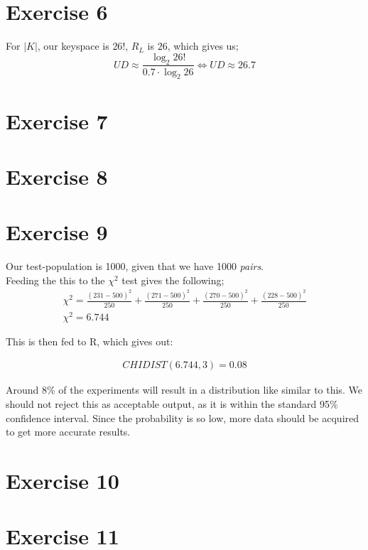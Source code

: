 \documentclass[10pt,a4paper]{article}
\begin{document}
\section*{Exercise 6}
For $|K|$, our keyspace is $26!$, $R_L$ is $26$, which gives us;
\begin{equation}
UD \approx \frac{\log_2{26!}}{0.7 \cdot \log_2{26}} \Leftrightarrow UD \approx 26.7
\end{equation}

\section*{Exercise 7}
\section*{Exercise 8}
\section*{Exercise 9}
Our test-population is 1000, given that we have 1000 \emph{pairs}.\\
Feeding the this to the $\chi^2$ test gives the following;
\begin{eqnarray}
\chi^2 = \frac{\left(231 - 500\right)^2}{250} + 
         \frac{\left(271 - 500\right)^2}{250} + 
         \frac{\left(270 - 500\right)^2}{250} + 
         \frac{\left(228 - 500\right)^2}{250} \\
\chi^2 = 6.744
\end{eqnarray}

This is then fed to R, which gives out:

\begin{eqnarray}
CHIDIST \left(6.744,3\right) = 0.08
\end{eqnarray}

Around 8\% of the experiments will result in a distribution like similar to this. We should not reject this as acceptable output, as it is within the standard 95\% confidence interval. Since the probability is so low, more data should be acquired to get more accurate results.

\section*{Exercise 10}
\section*{Exercise 11}
\end{document}
